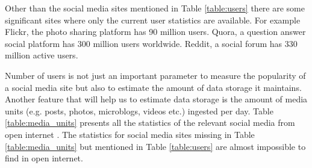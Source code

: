 \begin{table}[t]
{
}
    \label{table:users}
\end{table}

Other than the social media sites mentioned in Table \ref{table:users} there are some significant sites where only the current user statistics are available. For example Flickr, the photo sharing platform has 90 million users. Quora, a question answer social platform has 300 million users worldwide. Reddit, a social forum has 330 million active users.

Number of users is not just an important parameter to measure the popularity of a social media site but also to estimate the amount of data storage it maintains. Another feature that will help us to estimate data storage is the amount of media units (e.g. posts, photos, microblogs, videos etc.) ingested per day. Table \ref{table:media_units} presents all the statistics of the relevant social media from open internet \cite{zephoria, domo, statista, expandedramblings}. The statistics for social media sites missing in Table \ref{table:media_units} but mentioned in Table \ref{table:users} are almost impossible to find in open internet.



